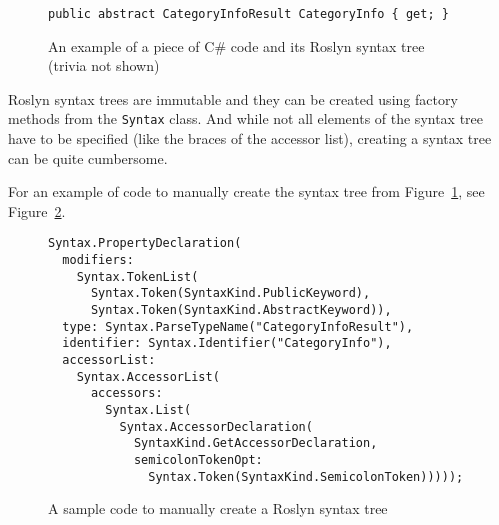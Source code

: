 \begin{figure}[htbp]

\begin{lstlisting}
public abstract CategoryInfoResult CategoryInfo { get; }
\end{lstlisting}

\begin{center}
\end{center}

\caption{An example of a piece of C\# code and its Roslyn syntax tree \\ (trivia not shown)}
\label{Syntax tree}
\end{figure}

\pagebreak[0]

Roslyn syntax trees are immutable and they can be created using factory methods from the \lstinline{Syntax} class.
And while not all elements of the syntax tree have to be specified (like the braces of the accessor list),
creating a syntax tree can be quite cumbersome.

For an example of code to manually create the syntax tree from Figure~\ref{Syntax tree}, see Figure~\ref{Roslyn code}.

\begin{figure}[htbp]

\begin{lstlisting}
Syntax.PropertyDeclaration(
  modifiers:
    Syntax.TokenList(
      Syntax.Token(SyntaxKind.PublicKeyword),
      Syntax.Token(SyntaxKind.AbstractKeyword)),
  type: Syntax.ParseTypeName("CategoryInfoResult"),
  identifier: Syntax.Identifier("CategoryInfo"),
  accessorList:
    Syntax.AccessorList(
      accessors:
        Syntax.List(
          Syntax.AccessorDeclaration(
            SyntaxKind.GetAccessorDeclaration,
            semicolonTokenOpt:
              Syntax.Token(SyntaxKind.SemicolonToken)))));
\end{lstlisting}

\caption{A sample code to manually create a Roslyn syntax tree}
\label{Roslyn code}
\end{figure}